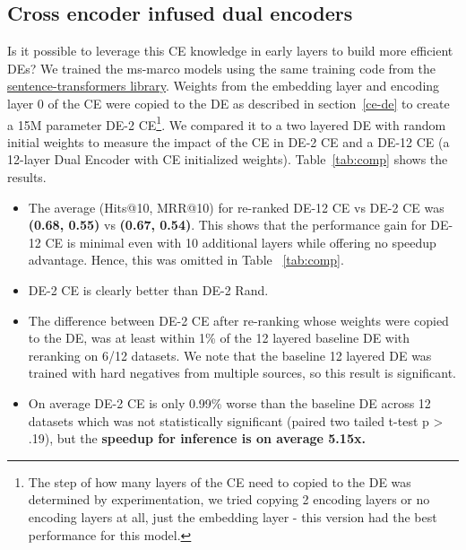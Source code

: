 \subsection{Cross encoder infused dual encoders}
\label{infused}
Is it possible to leverage this CE knowledge in early layers to build more efficient DEs?  We trained the ms-marco models using the same training code from the \href{https://github.com/UKPLab/sentence-transformers/blob/master/examples/training/ms_marco/train_bi-encoder_mnrl.py}{sentence-transformers library}. Weights from the embedding layer and encoding layer 0 of the CE were copied to the DE as described in section~\ref{ce-de} to create a 15M parameter DE-2 CE\footnote{The step of how many layers of the CE need to copied to the DE was determined by experimentation, we tried copying 2 encoding layers or no encoding layers at all, just the embedding layer - this version had the best performance for this model.}. We compared it to a two layered DE with random initial weights to measure the impact of the CE in DE-2 CE and a DE-12 CE (a 12-layer Dual Encoder with CE initialized weights). Table~\ref{tab:comp} shows the results.  
\begin{itemize}[noitemsep,topsep=0pt]
    \item The average (Hits@10, MRR@10) for re-ranked DE-12 CE vs DE-2 CE was \textbf{(0.68, 0.55)} vs \textbf{(0.67, 0.54)}. This shows that the performance gain for  DE-12 CE is minimal even with 10 additional layers while offering no speedup advantage. Hence, this was omitted in Table ~\ref{tab:comp}.
    \item DE-2 CE is clearly better than DE-2 Rand.
    \item The difference between DE-2 CE after re-ranking whose weights were copied to the DE, was at least within 1\% of the 12 layered baseline DE with reranking on 6/12 datasets. We note that the baseline 12 layered DE was trained with hard negatives from multiple sources, so this result is significant. 
    \item On average DE-2 CE is only 0.99\% worse than the baseline DE across 12 datasets which was not statistically significant (paired two tailed t-test p > .19), but the \textbf{speedup for inference is on average 5.15x.}
\end{itemize}     





